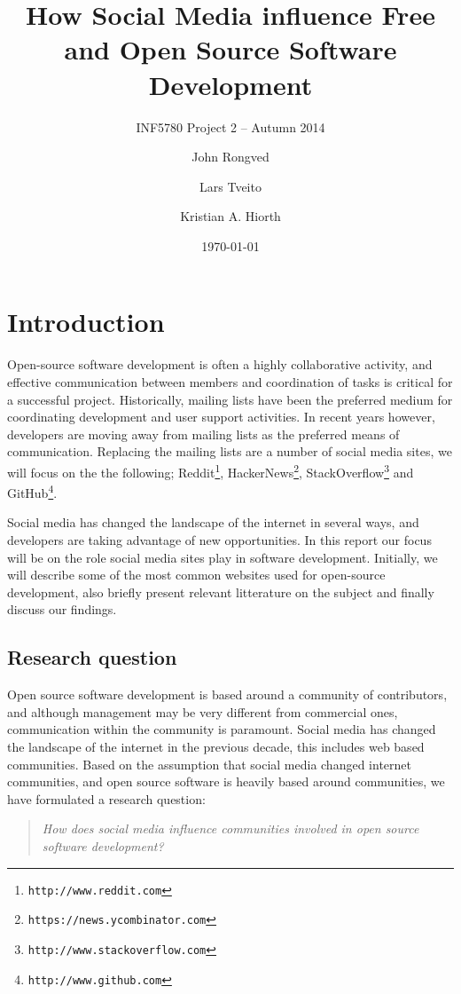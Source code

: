 \documentclass[a4paper,11pt]{article} %
\title{How Social Media influence Free and Open Source Software Development}
\subtitle{INF5780 Project 2 -- Autumn 2014}
\date{\today}
\author{John Rongved \and Lars Tveito \and Kristian A. Hiorth}
\begin{document}
\ififorside{}

\tableofcontents
\newpage

\section{Introduction}

Open-source software development is often a highly collaborative activity,
and effective communication between members and coordination of tasks is
critical for a successful project.  Historically, mailing lists have been
the preferred medium for coordinating development and user support
activities\cite{Vasilescu14StackOverflow}. In recent years however,
developers are moving away from mailing lists as the preferred means of
communication.  Replacing the mailing lists are a number of social media
sites, we will focus on the the following;
Reddit\footnote{\texttt{http://www.reddit.com}},
HackerNews\footnote{\texttt{https://news.ycombinator.com}},
StackOverflow\footnote{\texttt{http://www.stackoverflow.com}} and
GitHub\footnote{\texttt{http://www.github.com}}.


Social media has changed the landscape of the internet in several ways, and
developers are taking advantage of new opportunities. In this report our
focus will be on the role social media sites play in software
development. Initially, we will describe some of the most common websites
used for open-source development, also briefly present relevant litterature
on the subject and finally discuss our findings.

\subsection{Research question}

Open source software development is based around a community of
contributors, and although management may be very different from commercial
ones, communication within the community is paramount.  Social media has
changed the landscape of the internet in the previous
decade\cite{Kaplan201059}, this includes web based communities. Based on the
assumption that social media changed internet communities, and open source
software is heavily based around communities, we have formulated a research
question:
\begin{quote}
  \textit{How does social media influence communities involved in open source
    software development?}
\end{quote}
\end{document}
